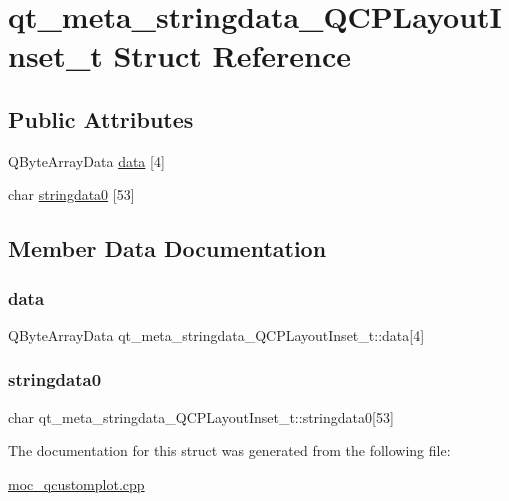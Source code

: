 \hypertarget{structqt__meta__stringdata__QCPLayoutInset__t}{}\section{qt\+\_\+meta\+\_\+stringdata\+\_\+\+Q\+C\+P\+Layout\+Inset\+\_\+t Struct Reference}
\label{structqt__meta__stringdata__QCPLayoutInset__t}
\subsection*{Public Attributes}
\begin{DoxyCompactItemize}
\item 
Q\+Byte\+Array\+Data \mbox{\hyperlink{structqt__meta__stringdata__QCPLayoutInset__t_ae85a598291582d31cc12989c0279ea44}{data}} \mbox{[}4\mbox{]}
\item 
char \mbox{\hyperlink{structqt__meta__stringdata__QCPLayoutInset__t_a7cc558fa6388df25517a33006f4a76a2}{stringdata0}} \mbox{[}53\mbox{]}
\end{DoxyCompactItemize}


\subsection{Member Data Documentation}
\mbox{\label{structqt__meta__stringdata__QCPLayoutInset__t_ae85a598291582d31cc12989c0279ea44}} 
\subsubsection{\texorpdfstring{data}{data}}
{\footnotesize\ttfamily Q\+Byte\+Array\+Data qt\+\_\+meta\+\_\+stringdata\+\_\+\+Q\+C\+P\+Layout\+Inset\+\_\+t\+::data\mbox{[}4\mbox{]}}

\mbox{\label{structqt__meta__stringdata__QCPLayoutInset__t_a7cc558fa6388df25517a33006f4a76a2}} 
\subsubsection{\texorpdfstring{stringdata0}{stringdata0}}
{\footnotesize\ttfamily char qt\+\_\+meta\+\_\+stringdata\+\_\+\+Q\+C\+P\+Layout\+Inset\+\_\+t\+::stringdata0\mbox{[}53\mbox{]}}



The documentation for this struct was generated from the following file\+:\begin{DoxyCompactItemize}
\item 
\mbox{\hyperlink{moc__qcustomplot_8cpp}{moc\+\_\+qcustomplot.\+cpp}}\end{DoxyCompactItemize}
